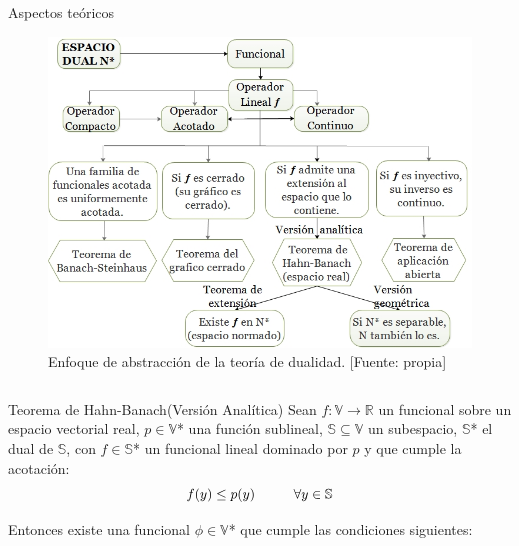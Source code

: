 \documentclass[24pt,final]{beamer}
\newlength{\onecolwid}
\newlength{\twocolwid}
\begin{document}
\begin{frame}[t]
\begin{columns}[t]
\begin{column}{\twocolwid}
\begin{columns}[t,totalwidth=\twocolwid]
\begin{column}{\onecolwid}
\begin{block}{Aspectos teóricos}
\begin{figure}[h]
	\centering
	\includegraphics[scale=1.4]{Pic/Esquema02}
	\caption{Enfoque de abstracción de la teoría de dualidad. [Fuente: propia]}\label{02}	
\end{figure}

\end{block}


\end{column} %

\end{columns} %


\begin{alertblock}{Teorema de Hahn-Banach(Versión Analítica)}
Sean $f: \mathbb{V} \longrightarrow \mathbb{R}$ un funcional sobre un espacio vectorial real,  $p \in \mathbb{V}$* una función sublineal, $ \mathbb{S} \subseteq \mathbb{V}$ un subespacio, $\mathbb{S}$* el dual de $\mathbb{S}$, con $f \in \mathbb{S}$* un funcional lineal dominado por $p$ y  que cumple la acotación:
\[f(y) \leq p(y) \hspace*{1cm} \forall y \in \mathbb{S} \]

Entonces existe una funcional $\phi \in \mathbb{V}$*
que cumple las condiciones siguientes:


\end{alertblock}
\end{column}
\end{columns}
\end{frame}
\end{document}
